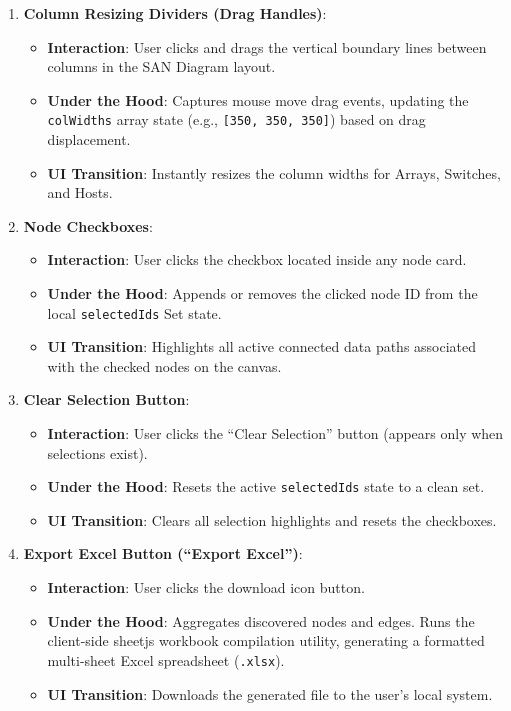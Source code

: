 \documentclass[11pt,a4paper]{article}
\begin{document}
\begin{enumerate}
    \item \textbf{Column Resizing Dividers (Drag Handles)}:
    \begin{itemize}
        \item \textbf{Interaction}: User clicks and drags the vertical boundary lines between columns in the SAN Diagram layout.
        \item \textbf{Under the Hood}: Captures mouse move drag events, updating the \texttt{colWidths} array state (e.g., \texttt{[350, 350, 350]}) based on drag displacement.
        \item \textbf{UI Transition}: Instantly resizes the column widths for Arrays, Switches, and Hosts.
    \end{itemize}
    
    \item \textbf{Node Checkboxes}:
    \begin{itemize}
        \item \textbf{Interaction}: User clicks the checkbox located inside any node card.
        \item \textbf{Under the Hood}: Appends or removes the clicked node ID from the local \texttt{selectedIds} Set state.
        \item \textbf{UI Transition}: Highlights all active connected data paths associated with the checked nodes on the canvas.
    \end{itemize}
    
    \item \textbf{Clear Selection Button}:
    \begin{itemize}
        \item \textbf{Interaction}: User clicks the ``Clear Selection'' button (appears only when selections exist).
        \item \textbf{Under the Hood}: Resets the active \texttt{selectedIds} state to a clean set.
        \item \textbf{UI Transition}: Clears all selection highlights and resets the checkboxes.
    \end{itemize}
    
    \item \textbf{Export Excel Button (``Export Excel'')}:
    \begin{itemize}
        \item \textbf{Interaction}: User clicks the download icon button.
        \item \textbf{Under the Hood}: Aggregates discovered nodes and edges. Runs the client-side sheetjs workbook compilation utility, generating a formatted multi-sheet Excel spreadsheet (\texttt{.xlsx}).
        \item \textbf{UI Transition}: Downloads the generated file to the user's local system.
    \end{itemize}
    

\end{enumerate}
\end{document}
